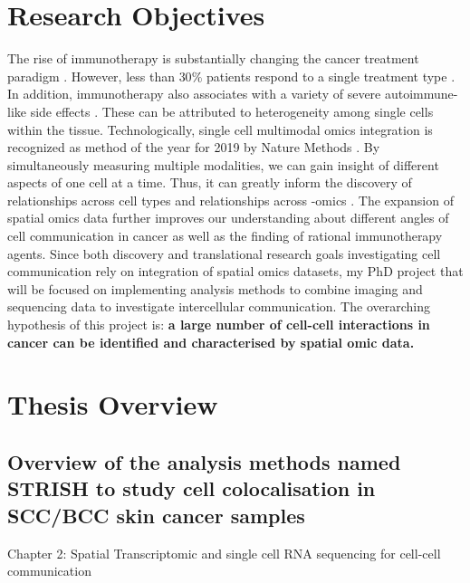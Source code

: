\section{Research Objectives}
The rise of immunotherapy is substantially changing the cancer treatment paradigm \cite{dobosz2019intriguing}. However, less than $30\%$ patients respond to a single treatment type \cite{ott2017combination}. In addition, immunotherapy also associates with a variety of severe autoimmune-like side effects \cite{naidoo2015toxicities,bertrand2015immune}. These can be attributed to heterogeneity among single cells within the tissue. Technologically, single cell multimodal omics integration is recognized as method of the year for 2019 by Nature Methods \cite{teichmann2020method}. By simultaneously measuring multiple modalities, we can gain insight of different aspects of one cell at a time. Thus, it can greatly inform the discovery of relationships across cell types and relationships across -omics \cite{teichmann2020method}. The expansion of spatial omics data further improves our understanding about different angles of cell communication in cancer as well as the finding of rational immunotherapy agents. Since both discovery and translational research goals investigating cell communication rely on integration of spatial omics datasets, my PhD project that will be focused on implementing analysis methods to combine imaging and sequencing data to investigate intercellular communication.   
The overarching hypothesis of this project is: \textbf{a large number of cell-cell interactions in cancer can be identified and characterised by spatial omic data.}



\section{Thesis Overview}
\subsection{Overview of the analysis methods named STRISH to study cell colocalisation in SCC/BCC skin cancer samples}

Chapter 2: Spatial Transcriptomic and single cell RNA sequencing for cell-cell communication 

